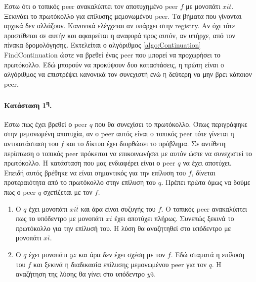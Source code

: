Έστω ότι ο τοπικός peer ανακαλύπτει τον αποτυχημένο peer $f$ με μονοπάτι $xit$. 
Ξεκινάει το πρωτόκολλο για επίλυσης μεμονωμένου peer.
Τα βήματα που γίνονται αρχικά δεν αλλάζουν. Κανονικά 
ελέγχεται αν υπάρχει στην registry. Αν όχι τότε προστίθεται σε αυτήν και 
αφαιρείται η αναφορά προς αυτόν, αν υπήρχε, από τον πίνακα δρομολόγησης. 
Εκτελείται ο αλγόριθμος \ref{algo:Continuation} FindContinuation ώστε να 
βρεθεί ένας peer που μπορεί να προχωρήσει το πρωτόκολλο. Εδώ μπορούν να 
προκύψουν δυο καταστάσεις, η πρώτη είναι ο αλγόριθμος να επιστρέψει κανονικά 
τον συνεχιστή ενώ η δεύτερη να μην βρει κάποιον peer.

\paragraph{Κατάσταση 1\textsuperscript{η}.}
Έστω πως έχει βρεθεί ο peer $q$ που θα συνεχίσει το πρωτόκολλο. Όπως 
περιγράφηκε στην μεμονωμένη αποτυχία, αν ο peer αυτός είναι ο τοπικός peer 
τότε γίνεται η αντικατάσταση του $f$ και το δίκτυο έχει διορθώσει το πρόβλημα. 
Σε αντίθετη περίπτωση ο τοπικός peer πρόκειται να επικοινωνήσει με αυτόν ώστε 
να συνεχιστεί το πρωτόκολλο. Η κατάσταση που μας ενδιαφέρει είναι ο peer $q$ 
να έχει αποτύχει. Επειδή αυτός βρέθηκε να είναι σημαντικός για την επίλυση 
του $f$, δίνεται προτεραιότητα από το πρωτόκολλο στην επίλυση του $q$. Πρέπει 
πρώτα όμως να δούμε πως ο peer $q$ σχετίζεται με τον $f$. 
\begin{enumerate}
\item Ο $q$ έχει μονοπάτι $xi \bar t$ και άρα είναι συζυγής του $f$. 
Ο τοπικός peer ανακαλύπτει πως το υπόδεντρο με μονοπάτι $xi$ έχει αποτύχει 
πλήρως. Συνεπώς ξεκινά το πρωτόκολλο για την επίλυσή του. Η λύση θα 
αναζητηθεί στο υπόδεντρο με μονοπάτι $x \bar i$.
\item Ο $q$ έχει μονοπάτι $yz$ και άρα δεν έχει σχέση με τον $f$. 
Εδώ σταματά η επίλυση του $f$ και ξεκινά η διαδικασία επίλυσης μεμονωμένου 
peer για τον $q$. Η αναζήτηση της λύσης θα γίνει στο υπόδεντρο $y \bar z$.
\end{enumerate}

